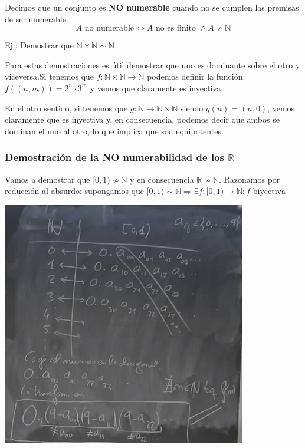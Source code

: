 \documentclass[10pt,a4paper,openright]{book}
\begin{document}
Decimos que un conjunto es \textbf{NO numerable} cuando no se cumplen las premisas de ser numerable.
$$A\mbox{ no numerable}\Leftrightarrow A\mbox{ no es finito }\wedge A\nsim \mathbb N$$

Ej.: Demostrar que $\mathbb N\times \mathbb N \sim \mathbb N$

Para estas demostraciones es útil demostrar que uno es dominante sobre el otro y viceversa.Si tenemos que $f:\mathbb N\times \mathbb N\longrightarrow \mathbb N$ podemos definir la función: $f((n,m))=2^n\cdot 3^m$ y vemos que claramente es inyectiva.

En el otro sentido, si tenemos que $g:\mathbb N \longrightarrow \mathbb N \times \mathbb N$ siendo $g(n)=(n,0)$, vemos claramente que es inyectiva y, en consecuencia, podemos decir que ambos se dominan el uno al otro, lo que implica que son equipotentes.

\subsubsection*{Demostración de la NO numerabilidad de los $\mathbb R$}
Vamos a demostrar que $[0,1)\nsim \mathbb N$ y en consecuencia $\mathbb R \nsim \mathbb N$. Razonamos por reducción al absurdo: supongamos que $[0,1)\sim  \mathbb N\Rightarrow \exists f: [0,1)\longrightarrow \mathbb N: f\mbox{ biyectiva}$

\begin{center}
\includegraphics[scale=1.1]{No numerabilidad de R}
\end{center}
\end{document}
